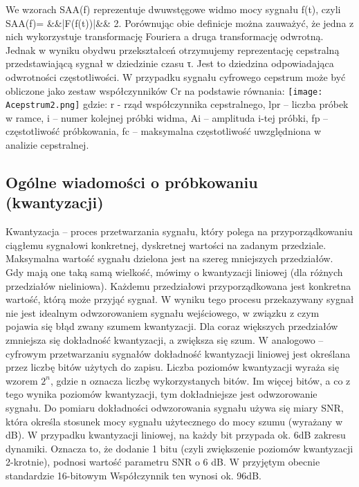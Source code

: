 \documentclass[a4paper,titleauthor]{mwart}
\begin{document}
	We wzorach SAA(f) reprezentuje dwuwstęgowe widmo mocy sygnału f(t), czyli SAA(f)= &&|F(f(t))|&& 2. Porównując obie definicje można zauważyć, że jedna z nich wykorzystuje transformację Fouriera a druga transformację odwrotną. Jednak w wyniku obydwu przekształceń otrzymujemy reprezentację cepstralną przedstawiającą sygnał w dziedzinie czasu τ. Jest to dziedzina odpowiadająca odwrotności częstotliwości.
	W przypadku sygnału cyfrowego cepstrum może być obliczone jako zestaw współczynników Cr na podstawie równania: \newline
	\texttt{[image: Acepstrum2.png]}
	gdzie: r - rząd współczynnika cepstralnego, lpr – liczba próbek w ramce, i – numer kolejnej próbki widma, Ai – amplituda i-tej próbki, fp – częstotliwość próbkowania, fc – maksymalna częstotliwość uwzględniona w analizie cepstralnej.
	
	\subsection{Ogólne wiadomości o próbkowaniu (kwantyzacji)}
	
	Kwantyzacja – proces przetwarzania sygnału, który polega na przyporządkowaniu ciągłemu sygnałowi konkretnej, dyskretnej wartości na zadanym przedziale. \newline\newline
	Maksymalna wartość sygnału dzielona jest na szereg mniejszych przedziałów. Gdy mają one taką samą wielkość, mówimy o kwantyzacji liniowej (dla różnych przedziałów nieliniowa).\newline 
	Każdemu przedziałowi przyporządkowana jest konkretna wartość, którą może przyjąć sygnał. W wyniku tego procesu przekazywany sygnał nie jest idealnym odwzorowaniem sygnału wejściowego, w związku z czym pojawia się błąd zwany szumem kwantyzacji. \newline\newline 
	Dla coraz większych przedziałów zmniejsza się dokładność kwantyzacji, a zwiększa się szum. \newline\newline
	W analogowo – cyfrowym przetwarzaniu sygnałów dokładność kwantyzacji liniowej jest określana przez liczbę bitów użytych do zapisu. \newline\newline
	Liczba poziomów kwantyzacji wyraża się wzorem $2^{n}$, gdzie n oznacza liczbę wykorzystanych bitów. Im więcej bitów, a co z tego wynika poziomów kwantyzacji, tym dokładniejsze jest odwzorowanie sygnału. \newline\newline
	Do pomiaru dokładności odwzorowania sygnału używa się miary SNR, która określa stosunek mocy sygnału użytecznego do mocy szumu (wyrażany w dB). W przypadku kwantyzacji liniowej, na każdy bit przypada ok. 6dB zakresu dynamiki. Oznacza to, że dodanie 1 bitu (czyli zwiększenie poziomów kwantyzacji 2-krotnie),  podnosi wartość parametru SNR o 6 dB. W przyjętym obecnie standardzie 16-bitowym Współczynnik ten wynosi ok. 96dB. \newline
	
\end{document}
